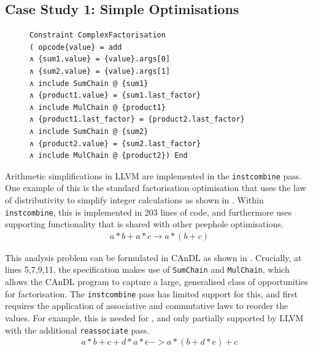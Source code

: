 \subsection{Case Study 1: Simple Optimisations}

\begin{figure}[t]
\begin{lstlisting}[language=CAnDL,label={fig:facopport},caption=
   {Factorisation opportunities in CAnDL: This captures some opportunities that
    LLVM {\tt instcombine} misses. {\tt SumChain} and {\tt MulChain} are
    themselves specified in CAnDL (16 LoC).}]
Constraint ComplexFactorisation
( opcode{value} = add
∧ {sum1.value} = {value}.args[0]
∧ {sum2.value} = {value}.args[1]
∧ include SumChain @ {sum1}
∧ {product1.value} = {sum1.last_factor}
∧ include MulChain @ {product1}
∧ {product1.last_factor} = {product2.last_factor}
∧ include SumChain @ {sum2}
∧ {product2.value} = {sum2.last_factor}
∧ include MulChain @ {product2}) End
\end{lstlisting}
\end{figure}

    Arithmetic simplifications in LLVM are implemented in the
    \texttt{instcombine} pass.
    One example of this is the standard factorisation optimisation that uses the
    law of distributivity to simplify integer calculations as shown in
    .
    Within {\tt instcombine}, this is implemented in 203 lines of code, and
    furthermore uses supporting functionality that is shared with other peephole
    optimisations.
    \begin{align}
        a*b+a*c\rightarrow a*(b+c)
        \label{fig:factorization1}
    \end{align}

    This analysis problem can be formulated in CAnDL as shown in
    .
    Crucially, at lines 5,7,9,11, the specification makes use of
    \texttt{SumChain} and \texttt{MulChain}, which allows the CAnDL program
    to capture a large, generalised class of opportunities for factorisation.
    The \texttt{instcombine} pass has limited support for this, and
    first requires the application of associative and commutative laws to
    reorder the values.
    For example, this is needed for , and only
    partially supported by LLVM with the additional \texttt{reassociate} pass.
    \begin{align}
        a*b+c+d*a*e->a*(b+d*e)+c
        \label{fig:factorization2}
    \end{align}

